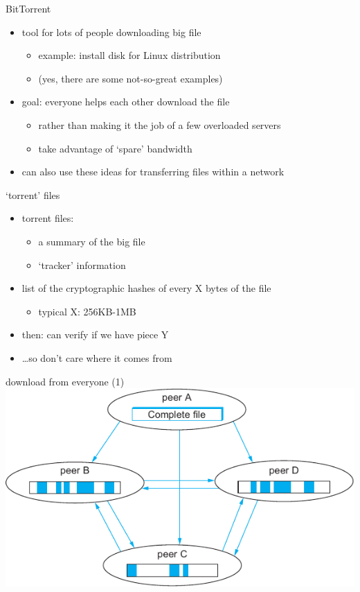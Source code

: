 \begin{frame}{BitTorrent}
    \begin{itemize}
    \item tool for lots of people downloading big file
        \begin{itemize}
        \item example: install disk for Linux distribution
        \item (yes, there are some not-so-great examples)
        \end{itemize}
    \item goal: everyone helps each other download the file
        \begin{itemize}
        \item rather than making it the job of a few overloaded servers
        \item take advantage of `spare' bandwidth
        \end{itemize}
    \item can also use these ideas for transferring files within a network
    \end{itemize}
\end{frame}

\begin{frame}{`torrent' files}
    \begin{itemize}
    \item torrent files:
        \begin{itemize}
        \item a summary of the big file
        \item `tracker' information
        \end{itemize}
    \item list of the cryptographic hashes of every X bytes of the file
        \begin{itemize}
        \item typical X: 256KB-1MB
        \end{itemize}
    \vspace{.5cm}
    \item then: can verify if we have piece Y
    \item \ldots so don't care where it comes from
    \end{itemize}
\end{frame}

\begin{frame}{download from everyone (1)}
\includegraphics[height=0.9\textheight]{../p2p/sysapp-bittorrent.pdf}
\end{frame}

